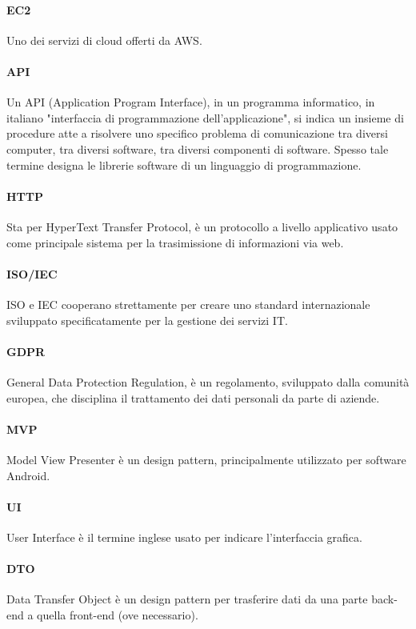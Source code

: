 \paragraph{EC2} Uno dei servizi di cloud offerti da AWS.

\paragraph{API} Un API (Application Program Interface), in un programma informatico, in italiano "interfaccia di programmazione dell'applicazione", si indica un insieme di procedure atte a risolvere uno specifico problema di comunicazione tra diversi computer, tra diversi software, tra diversi componenti di software.
Spesso tale termine designa le librerie software di un linguaggio di programmazione.

\paragraph{HTTP} Sta per HyperText Transfer Protocol, è un protocollo a livello applicativo usato come principale sistema per la trasimissione di informazioni via web.

\paragraph{ISO/IEC} ISO e IEC cooperano strettamente per creare uno standard internazionale sviluppato specificatamente per la gestione dei servizi IT.

\paragraph{GDPR} General Data Protection Regulation, è un regolamento, sviluppato dalla comunità europea, che disciplina il trattamento dei dati personali da parte di aziende.

\paragraph{MVP} Model View Presenter è un design pattern, principalmente utilizzato per software Android.

\paragraph{UI} User Interface è il termine inglese usato per indicare l'interfaccia grafica.

\paragraph{DTO} Data Transfer Object è un design pattern per trasferire dati da una parte back-end a quella front-end (ove necessario).

